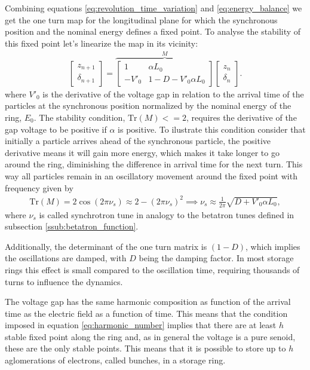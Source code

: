 \documentclass[
	12pt,				%
	openright,			%
	oneside,			%
	a4paper,		%
	chapter=TITLE,		%
	section=TITLE,		%
    brazil,				%
	english,			%
	sumario=tradicional,
	]{abntex2}
\begin{document}
	Combining equations \eqref{eq:revolution_time_variation} and \eqref{eq:energy_balance} we get the one turn map for the longitudinal plane for which the synchronous position and the nominal energy defines a fixed point. To analyse the stability of this fixed point let's linearize the map in its vicinity:
	\begin{align}
		\begin{bmatrix} z_{n+1} \\ \delta_{n+1}\end{bmatrix} = \overbrace{
			\begin{bmatrix} 1 & \alpha L_0 \\ -V'_0 & 1-D - V'_0\alpha L_0 \end{bmatrix}
		}^M \begin{bmatrix} z_n \\ \delta_n \end{bmatrix}.
	\end{align}
	where $V'_0$ is the derivative of the voltage gap in relation to the arrival time of the particles at the synchronous position normalized by the nominal energy of the ring, $E_0$. The stability condition, $\text{Tr}(M) <= 2$, requires the derivative of the gap voltage to be positive if $\alpha$ is positive. To ilustrate this condition consider that initially a particle arrives ahead of the synchronous particle, the positive derivative means it will gain more energy, which makes it take longer to go around the ring, diminishing the difference in arrival time for the next turn. This way all particles remain in an oscillatory movement around the fixed point with frequency given by
	\begin{align}
		\text{Tr}(M) = 2\cos(2\pi\nu_s) \approx 2-(2\pi\nu_s)^2 \implies
		\nu_s \approx \frac{1}{2\pi}\sqrt{D+V'_0\alpha L_0},
	\end{align}
	where $\nu_s$ is called synchrotron tune in analogy to the betatron tunes defined in subsection \ref{ssub:betatron_function}.

	Additionally, the determinant of the one turn matrix is $(1-D)$, which implies the oscillations are damped, with $D$ being the damping factor. In most storage rings this effect is small compared to the oscillation time, requiring thousands of turns to influence the dynamics.

	The voltage gap has the same harmonic composition as function of the arrival time as the electric field as a function of time. This means that the condition imposed in equation \eqref{eq:harmonic_number} implies that there are at least $h$ stable fixed point along the ring and, as in general the voltage is a pure senoid, these are the only stable points. This means that it is possible to store up to $h$ aglomerations of electrons, called bunches, in a storage ring.
\end{document}
